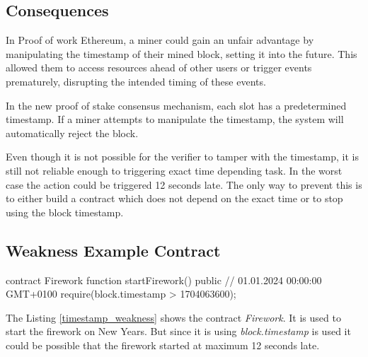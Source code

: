 \subsection{Consequences}

In Proof of work Ethereum, a miner could gain an unfair advantage by
manipulating the timestamp of their mined block, setting it into the future.
This allowed them to access resources ahead of other users or trigger events
prematurely, disrupting the intended timing of these events.

In the new proof of stake consensus mechanism, each slot has a predetermined
timestamp. If a miner attempts to manipulate the timestamp, the system will
automatically reject the block.

Even though it is not possible for the verifier to tamper with the timestamp,
it is still not reliable enough to triggering exact time depending task. In the
worst case the action could be triggered 12 seconds late. The only way to
prevent this is to either build a contract which does not depend on the exact
time or to stop using the block timestamp.

\subsection{Weakness Example Contract}

\begin{solidity}[caption=Weakness, label={timestamp_weakness}]
contract Firework {
  function startFirework() public {
    // 01.01.2024 00:00:00 GMT+0100
    require(block.timestamp > 1704063600);
  }
}
\end{solidity}
The Listing \ref{timestamp_weakness} shows the contract \textit{Firework}. It
is used to start the firework on New Years. But since it is using
\textit{block.timestamp} is used it could be possible that the firework started at
maximum 12 seconds late.

%
%

    

